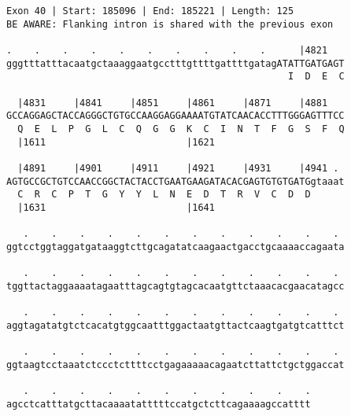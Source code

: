 \documentclass{article}
\begin{document}
\begin{Verbatim}[fontfamily=courier]
Exon 40 | Start: 185096 | End: 185221 | Length: 125
BE AWARE: Flanking intron is shared with the previous exon

.    .    .    .    .    .    .    .    .    .      |4821   
gggtttatttacaatgctaaaggaatgcctttgttttgattttgatagATATTGATGAGT
                                                  I  D  E  C

  |4831     |4841     |4851     |4861     |4871     |4881   
GCCAGGAGCTACCAGGGCTGTGCCAAGGAGGAAAATGTATCAACACCTTTGGGAGTTTCC
  Q  E  L  P  G  L  C  Q  G  G  K  C  I  N  T  F  G  S  F  Q
  |1611                         |1621                       

  |4891     |4901     |4911     |4921     |4931     |4941 . 
AGTGCCGCTGTCCAACCGGCTACTACCTGAATGAAGATACACGAGTGTGTGATGgtaaat
  C  R  C  P  T  G  Y  Y  L  N  E  D  T  R  V  C  D  D      
  |1631                         |1641                       

   .    .    .    .    .    .    .    .    .    .    .    . 
ggtcctggtaggatgataaggtcttgcagatatcaagaactgacctgcaaaaccagaata

   .    .    .    .    .    .    .    .    .    .    .    . 
tggttactaggaaaatagaatttagcagtgtagcacaatgttctaaacacgaacatagcc

   .    .    .    .    .    .    .    .    .    .    .    . 
aggtagatatgtctcacatgtggcaatttggactaatgttactcaagtgatgtcatttct

   .    .    .    .    .    .    .    .    .    .    .    . 
ggtaagtcctaaatctccctcttttcctgagaaaaacagaatcttattctgctggaccat

   .    .    .    .    .    .    .    .    .    .    .
agcctcatttatgcttacaaaatatttttccatgctcttcagaaaagccatttt
\end{Verbatim}
\newpage
\end{document}
